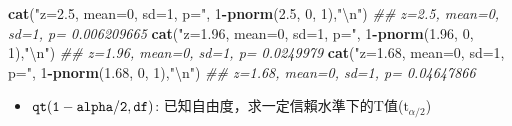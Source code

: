 \documentclass[hyperref,]{ctexart}
\newenvironment{Shaded}{\begin{snugshade}}{\end{snugshade}}
\newcommand{\CharTok}[1]{\textcolor[rgb]{0.31,0.60,0.02}{#1}}
\newcommand{\CommentTok}[1]{\textcolor[rgb]{0.56,0.35,0.01}{\textit{#1}}}
\newcommand{\DecValTok}[1]{\textcolor[rgb]{0.00,0.00,0.81}{#1}}
\newcommand{\FloatTok}[1]{\textcolor[rgb]{0.00,0.00,0.81}{#1}}
\newcommand{\KeywordTok}[1]{\textcolor[rgb]{0.13,0.29,0.53}{\textbf{#1}}}
\newcommand{\NormalTok}[1]{#1}
\newcommand{\OperatorTok}[1]{\textcolor[rgb]{0.81,0.36,0.00}{\textbf{#1}}}
\newcommand{\StringTok}[1]{\textcolor[rgb]{0.31,0.60,0.02}{#1}}
\providecommand{\tightlist}{%
  \setlength{\itemsep}{0pt}\setlength{\parskip}{0pt}}
\begin{document}
\begin{Shaded}
\begin{Highlighting}[]
\KeywordTok{cat}\NormalTok{(}\StringTok{"z=2.5, mean=0, sd=1, p="}\NormalTok{, }\DecValTok{1}\OperatorTok{-}\KeywordTok{pnorm}\NormalTok{(}\FloatTok{2.5}\NormalTok{, }\DecValTok{0}\NormalTok{, }\DecValTok{1}\NormalTok{),}\StringTok{"}\CharTok{\textbackslash{}n}\StringTok{"}\NormalTok{)}
\CommentTok{## z=2.5, mean=0, sd=1, p= 0.006209665}
\KeywordTok{cat}\NormalTok{(}\StringTok{"z=1.96, mean=0, sd=1, p="}\NormalTok{, }\DecValTok{1}\OperatorTok{-}\KeywordTok{pnorm}\NormalTok{(}\FloatTok{1.96}\NormalTok{, }\DecValTok{0}\NormalTok{, }\DecValTok{1}\NormalTok{),}\StringTok{"}\CharTok{\textbackslash{}n}\StringTok{"}\NormalTok{)}
\CommentTok{## z=1.96, mean=0, sd=1, p= 0.0249979}
\KeywordTok{cat}\NormalTok{(}\StringTok{"z=1.68, mean=0, sd=1, p="}\NormalTok{, }\DecValTok{1}\OperatorTok{-}\KeywordTok{pnorm}\NormalTok{(}\FloatTok{1.68}\NormalTok{, }\DecValTok{0}\NormalTok{, }\DecValTok{1}\NormalTok{),}\StringTok{"}\CharTok{\textbackslash{}n}\StringTok{"}\NormalTok{)}
\CommentTok{## z=1.68, mean=0, sd=1, p= 0.04647866}
\end{Highlighting}
\end{Shaded}

\begin{itemize}
\tightlist
\item
  \(\tt{qt(1-alpha/2, df)}\):
  已知自由度，求一定信賴水準下的T值(\(\text{t}_{\alpha/2}\))
\end{itemize}
\end{document}
